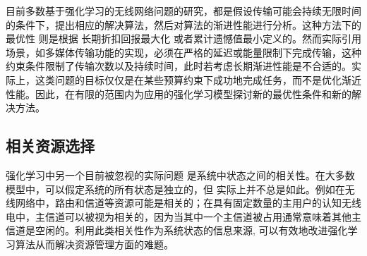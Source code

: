 ﻿\documentclass[11pt,draftclsnofoot,onecolumn,journal,letterpaper]{IEEEtran}
\begin{document}
目前多数基于强化学习的无线网络问题的研究，都是假设传输可能会持续无限时间的条件下，提出相应的解决算法，然后对算法的渐进性能进行分析。这种方法下的最优性 则是根据 长期折扣回报最大化 或者累计遗憾值最小定义的。然而实际引用场景，如多媒体传输功能的实现，必须在严格的延迟或能量限制下完成传输，这种约束条件限制了传输次数以及持续时间，此时若考虑长期渐进性能是不合适的。实际上，这类问题的目标仅仅是在某些预算约束下成功地完成任务，而不是优化渐近性能。因此，在有限的范围内为应用的强化学习模型探讨新的最优性条件和新的解决方法。


\subsection{相关资源选择}
强化学习中另一个目前被忽视的实际问题 是系统中状态之间的相关性。在大多数模型中，可以假定系统的所有状态是独立的，但 实际上并不总是如此。例如在无线网络中，路由和信道等资源可能是相关的；在具有固定数量的主用户的认知无线电中，主信道可以被视为相关的，因为当其中一个主信道被占用通常意味着其他主信道是空闲的。利用此类相关性作为系统状态的信息来源, 可以有效地改进强化学习算法从而解决资源管理方面的难题。

%
%
\end{document}
